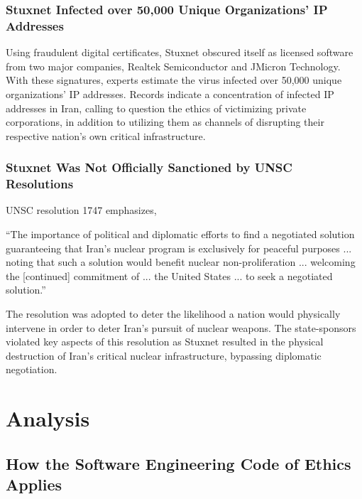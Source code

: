 \documentclass[12pt]{article}
\begin{document}
\begin{multicols}{2}
\subsubsection{Stuxnet Infected over 50,000 Unique Organizations' IP Addresses}

Using fraudulent digital certificates, Stuxnet obscured itself as licensed software from two major companies, Realtek Semiconductor and JMicron Technology. With these signatures, experts estimate the virus infected over 50,000 unique organizations' IP addresses.\cite{lessonsFromStuxnet} Records indicate a concentration of infected IP addresses in Iran, calling to question the ethics of victimizing private corporations, in addition to utilizing them as channels of disrupting their respective nation's own critical infrastructure.\cite{w32.stuxnetDossier} 

\subsubsection{Stuxnet Was Not Officially Sanctioned by UNSC Resolutions}

UNSC resolution 1747 emphasizes,

\begin{displayquote}
``The importance of political and diplomatic efforts to find a negotiated solution guaranteeing that Iran's nuclear program is exclusively for peaceful purposes ... noting that such a solution would benefit nuclear non-proliferation ... welcoming the [continued] commitment of ... the United States ... to seek a negotiated solution.''\cite{resolution1747}
\end{displayquote}

The resolution was adopted to deter the likelihood a nation would physically intervene in order to deter Iran's pursuit of nuclear weapons. The state-sponsors violated key aspects of this resolution as Stuxnet resulted in the physical destruction of Iran's critical nuclear infrastructure, bypassing diplomatic negotiation.


\section{Analysis}

\subsection{How the Software Engineering Code of Ethics Applies}


\end{multicols}
\end{document}
